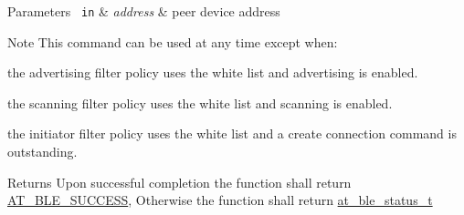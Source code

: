 \begin{DoxyParams}[1]{Parameters}
\mbox{\texttt{ in}}  & {\em address} & peer device address\\
\hline
\end{DoxyParams}
\begin{DoxyNote}{Note}
This command can be used at any time except when\+:
\begin{DoxyItemize}
\item the advertising filter policy uses the white list and advertising is enabled.
\item the scanning filter policy uses the white list and scanning is enabled.
\item the initiator filter policy uses the white list and a create connection command is outstanding.
\end{DoxyItemize}
\end{DoxyNote}
\begin{DoxyReturn}{Returns}
Upon successful completion the function shall return \mbox{\hyperlink{group__error__codes__group_gga3b1db9b95feb157b3c188ca27fe76988a7e3bfff5387331cd4f2c56cbcbbd7e19}{A\+T\+\_\+\+B\+L\+E\+\_\+\+S\+U\+C\+C\+E\+SS}}, Otherwise the function shall return \mbox{\hyperlink{at__ble__api_8h_ace24eb4e5ca3f325c663b809da5feb92}{at\+\_\+ble\+\_\+status\+\_\+t}} 
\end{DoxyReturn}
